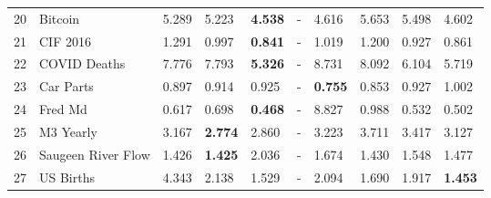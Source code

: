 \begin{tabular}{llllllllll}
20 & Bitcoin & 5.289 & 5.223 & \textbf{4.538} & - & 4.616 & 5.653 & 5.498 & 4.602 \\
21 & CIF 2016 & 1.291 & 0.997 & \textbf{0.841} & - & 1.019 & 1.200 & 0.927 & 0.861 \\
22 & COVID Deaths & 7.776 & 7.793 & \textbf{5.326} & - & 8.731 & 8.092 & 6.104 & 5.719 \\
23 & Car Parts & 0.897 & 0.914 & 0.925 & - & \textbf{0.755} & 0.853 & 0.927 & 1.002 \\
24 & Fred Md & 0.617 & 0.698 & \textbf{0.468} & - & 8.827 & 0.988 & 0.532 & 0.502 \\
25 & M3 Yearly & 3.167 & \textbf{2.774} & 2.860 & - & 3.223 & 3.711 & 3.417 & 3.127 \\
26 & Saugeen River Flow & 1.426 & \textbf{1.425} & 2.036 & - & 1.674 & 1.430 & 1.548 & 1.477 \\
27 & US Births & 4.343 & 2.138 & 1.529 & - & 2.094 & 1.690 & 1.917 & \textbf{1.453} \\
\bottomrule
\end{tabular}
